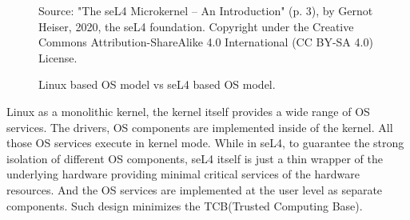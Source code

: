 \begin{figure}[h]
    {Source: "The seL4 Microkernel – An Introduction" (p. 3), by Gernot Heiser, 2020, the seL4 foundation. Copyright  under the Creative Commons Attribution-ShareAlike 4.0 International (CC BY-SA 4.0) License.}
    
    \caption{Linux based OS model vs seL4 based OS model.}
    \label{fig:osmodel}
\end{figure}

Linux as a monolithic kernel, the kernel itself provides a wide range of OS services. The drivers, OS components are implemented inside of the kernel. All those OS services execute in kernel mode. While in seL4, to guarantee the strong isolation of different OS components, seL4 itself is just a thin wrapper of the underlying hardware providing minimal critical services of the hardware resources. And the OS services are implemented at the user level as separate components. Such design minimizes the TCB(Trusted Computing Base). 

